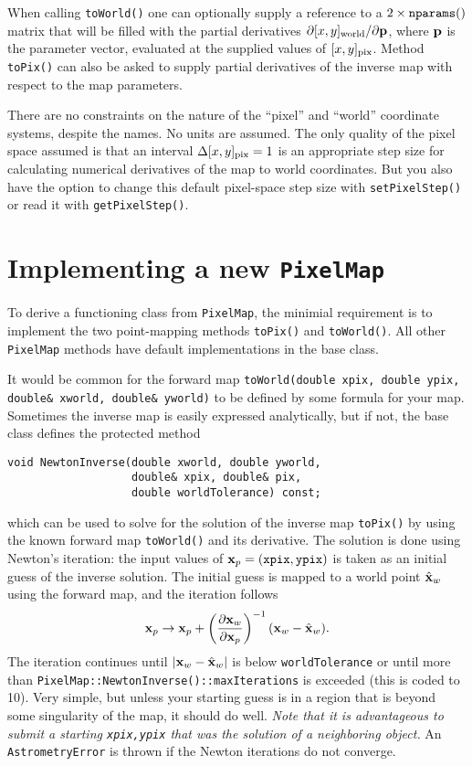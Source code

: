 \documentclass[11pt,preprint,flushrt]{aastex}
\begin{document}
When calling {\tt toWorld()} one can optionally supply a reference to a $2\times{\tt nparams()}$ matrix that will be filled with the partial derivatives $\partial[x,y]_{\rm world} / \partial {\bf p}$, where ${\bf p}$ is the parameter vector, evaluated at the supplied values of $[x,y]_{\rm pix}$.  Method {\tt toPix()} can also be asked to supply partial derivatives of the inverse map with respect to the map parameters.

There are no constraints on the nature of the ``pixel'' and ``world'' coordinate systems, despite the names.  No units are assumed.  The only quality of the pixel space assumed is that an interval $\Delta [x,y]_{\rm pix}=1$ is an appropriate step size for calculating numerical derivatives of the map to world coordinates.  But you also have the option to change this default pixel-space step size with {\tt setPixelStep()} or read it with {\tt getPixelStep()}.

\section{Implementing a new {\tt PixelMap}}
To derive a functioning class from {\tt PixelMap}, the minimial requirement is to implement the two point-mapping methods {\tt toPix()} and {\tt toWorld()}.  All other {\tt PixelMap} methods have default implementations in the base class.

It would be common for the forward map {\tt toWorld(double xpix, double ypix, double\& xworld, double\& yworld)} to be defined by some formula for your map.  Sometimes the inverse map is easily expressed analytically, but if not, the base class defines the protected method
\begin{verbatim}
void NewtonInverse(double xworld, double yworld, 
                   double& xpix, double& pix,
                   double worldTolerance) const;
\end{verbatim}
which can be used to solve for the solution of the inverse map {\tt toPix()} by using the known forward map {\tt toWorld()} and its derivative.  The solution is done using Newton's iteration: the input values of ${\bf x}_p={\tt (xpix,ypix)}$ is taken as an initial guess of the inverse solution.  The initial guess is mapped to a world point $\hat {\bf x}_w$ using the forward map, and the iteration follows
\begin{equation}
{\bf x}_p \rightarrow {\bf x}_p + \left( \frac{\partial {\bf x}_w}{\partial {\bf x}_p}\right)^{-1} ({\bf x}_w - \hat{\bf x}_w).
\end{equation}
The iteration continues until $|{\bf x}_w - \hat{\bf x}_w|$ is below {\tt worldTolerance} or until more than {\tt PixelMap::NewtonInverse()::maxIterations} is exceeded (this is coded to 10).  Very simple, but unless your starting guess is in a region that is beyond some singularity of the map, it should do well.  {\em Note that it is advantageous to submit a starting {\tt xpix,ypix} that was the solution of a neighboring object.}  An {\tt AstrometryError} is thrown if the Newton iterations do not converge.
\end{document}
